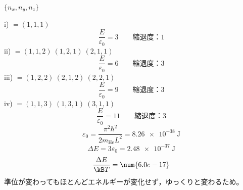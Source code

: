 $\{n_{x},n_{y},n_{z}\}$

i) $=(1,1,1)$
\[ \frac{E}{\varepsilon_{0}}=3\qquad\text{縮退度：}1 \]
ii) $=(1,1,2)\ (1,2,1)\ (2,1,1)$
\[ \frac{E}{\varepsilon_{0}}=6\qquad\text{縮退度：}3 \]
iii) $=(1,2,2)\ (2,1,2)\ (2,2,1)$
\[ \frac{E}{\varepsilon_{0}}=9\qquad\text{縮退度：}3 \]
iv) $=(1,1,3)\ (1,3,1)\ (3,1,1)$
\[ \frac{E}{\varepsilon_{0}}=11\qquad\text{縮退度：}3 \]
\[ \varepsilon_{0}=\frac{\pi^{2}\hbar^{2}}{2m_{\mathrm{He}}L^{2}}=\qty{8.26e-38}{\joule} \]
\[ \Delta E=3\varepsilon_{0}=\qty{2.48e-37}{\joule} \]
\[ \frac{\Delta E}{\kB T}=\num{6.0e-17} \]
準位が変わってもほとんどエネルギーが変化せず，ゆっくりと変わるため。
